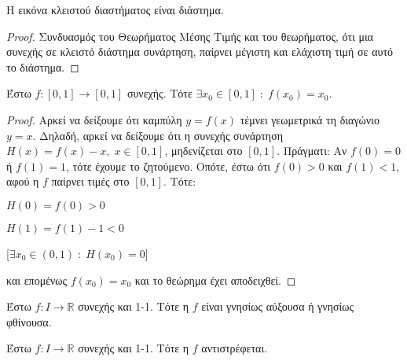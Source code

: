 \documentclass[main.tex]{subfiles}
\begin{document}
        \begin{prop}
            Η εικόνα κλειστού διαστήματος είναι διάστημα. 
        \end{prop}

        \begin{proof}
            Συνδυασμός του Θεωρήματος Μέσης Τιμής και του θεωρήματος, ότι μια συνεχής σε 
            κλειστό διάστημα συνάρτηση, παίρνει μέγιστη και ελάχιστη τιμή σε αυτό το διάστημα.
        \end{proof}

        \begin{thm}
            Έστω $ f \colon [0,1] \to [0,1] $ συνεχής. Τότε $ \exists x_{0} \in [0,1] \; 
            : \; f(x_{0}) = x_{0} $.
        \end{thm}

        \begin{proof}
        \item {}
            Αρκεί να δείξουμε ότι καμπύλη $ y= f(x) $ τέμνει γεωμετρικά τη διαγώνιο $ y=x $.
            Δηλαδή, αρκεί να δείξουμε ότι η συνεχής συνάρτηση $ H(x) = f(x)-x, \; x \in [0,1] $, 
            μηδενίζεται στο $ [0,1] $. Πράγματι:
            Αν $ f(0)=0 $ ή $ f(1)= 1 $, τότε έχουμε το ζητούμενο. Οπότε, έστω ότι 
            $ f(0) > 0 $ και $ f(1)<1 $, αφού η $ f $ παίρνει τιμές στο $ [0,1] $. Τότε:

            \begin{minipage}{0.3\textwidth}
                \begin{myitemize}
                \item $ H(0) = f(0) > 0 $ \hfill {}
                \item $ H(1) = f(1)-1 < 0 $ \hfill {}
                \end{myitemize}
            \end{minipage}
            [$ \exists x_{0} \in (0,1) \; : \; H(x_{0}) = 0$]

            και επομένως $ f(x_{0}) = x_{0} $ και το θεώρημα έχει αποδειχθεί.
        \end{proof}

        \begin{thm}
            Έστω $ f \colon I \to \mathbb{R} $ συνεχής και 1-1. Τότε η $f$ είναι 
            γνησίως αύξουσα ή γνησίως φθίνουσα.
        \end{thm}

        \begin{thm}
            Έστω $ f \colon I \to \mathbb{R} $ συνεχής και 1-1. Τότε η $f$ αντιστρέφεται.
        \end{thm}
\end{document}
